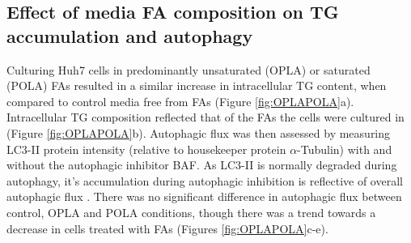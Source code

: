 \subsection{Effect of media FA composition on TG accumulation and autophagy}

Culturing Huh7 cells in predominantly unsaturated (OPLA) or saturated (POLA) FAs resulted in a similar increase in intracellular TG content, when compared to control media free from FAs (Figure \ref{fig:OPLAPOLA}a). Intracellular TG composition reflected that of the FAs the cells were cultured in (Figure \ref{fig:OPLAPOLA}b). Autophagic flux was then assessed by measuring LC3-II protein intensity (relative to housekeeper protein $\alpha$-Tubulin) with and without the autophagic inhibitor BAF. As LC3-II is normally degraded during autophagy, it's accumulation during autophagic inhibition is reflective of overall autophagic flux \cite{DJ2021Guidelines1}. There was no significant difference in autophagic flux between control, OPLA and POLA conditions, though there was a trend towards a decrease in cells treated with FAs (Figures \ref{fig:OPLAPOLA}c-e).

